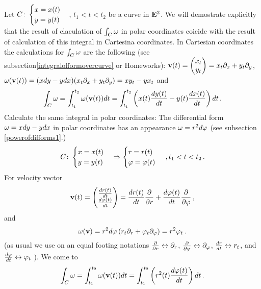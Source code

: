 \documentclass[12pt]{article}
\numberwithin{equation}{section}
\begin{document}
 Let $C\colon \begin{cases}x=x(t)\cr y=y(t)\end{cases}$, $t_1<t<t_2$
be a curve in ${\bf E}^2$. We will demostrate explicitly that
the result of claculation of $\int_C{\omega}$ in polar coordinates
coicide with the result of calculation of this integral in
Cartesina coordinates.
    In Cartesian coordinates  the calculations for
$\int_C{\omega}$ are the following (see subsection\ref{integralofformovercurve}
or Homeworks):
${\bf v}(t)=\begin{pmatrix}x_t\cr y_t\cr\end{pmatrix}=x_t\partial_x+y_t\partial_y$,
${\omega}({\bf v}(t))=(xdy-ydx)(x_t\partial_x+y_t\partial_y)=xy_t-yx_t$ and
                  \begin{equation}\label{integralinCartesian}
\int_C{\omega}=
\int_{t_1}^{t_2} {\omega}({\bf v}(t))dt=
\int_{t_1}^{t_2} \left(
          x(t){dy(t)\over dt}-
          y(t){dx(t)\over dt}
                      \right)dt\,.
\end{equation}
Calculate the same integral in polar coordinates:
The differential form ${\omega}=xdy-ydx$
in polar coordinates has an appearance
      ${\omega}=r^2d\varphi$ (see subsection \ref{powerofdifforms1}.)
            $$
      C\colon \begin{cases}x=x(t)\cr y=y(t)\end{cases}
            \Rightarrow
     \begin{cases}r=r(t)\cr \varphi=\varphi(t)\end{cases}\,,
t_1<t<t_2\,.
     $$
For velocity vector
          $$
{\bf v}(t)=\begin{pmatrix}
          {dr(t)\over dt}\cr 
          {d\varphi(t)\over dt}\cr
          \end{pmatrix}=
          {dr(t)\over dt}{\partial\over \partial r}+ 
          {d\varphi(t)\over dt}{\partial\over \partial \varphi}\,,
            $$
and
            $$
{\omega}({\bf v})=r^2d\varphi\left(r_t\partial_r+\varphi_t\partial_\varphi\right)=
        r^2\varphi_t\,.
                $$
(as usual we use on an equal footing notations
   ${\partial\over \partial r}\leftrightarrow \partial_r$, 
   ${\partial\over \partial \varphi}\leftrightarrow \partial_\varphi$,
   ${dr\over dt}\leftrightarrow r_t$,
and  ${d\varphi\over dt}\leftrightarrow \varphi_t$ 
).  We come to
                  \begin{equation}\label{integralinpolar}
\int_C{\omega}=
\int_{t_1}^{t_2} {\omega}({\bf v}(t))dt=
\int_{t_1}^{t_2} \left(
          r^2(t){d\varphi(t)\over dt}
                      \right)dt\,.
\end{equation}
\end{document}
